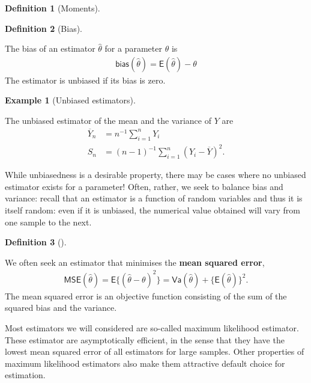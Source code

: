 \documentclass[
  11pt,
  letterpaper,
]{scrbook}
\theoremstyle{plain}
\theoremstyle{definition}
\newtheorem{example}{Example}[chapter]
\theoremstyle{definition}
\newtheorem{definition}{Definition}[chapter]
\theoremstyle{remark}
\begin{document}
\begin{definition}[Moments]
\end{definition}

\begin{definition}[Bias]\protect\hypertarget{def-bias}{}\label{def-bias}

The bias of an estimator \(\hat{\theta}\) for a parameter \(\theta\) is
\begin{align*}
 \mathsf{bias}(\hat{\theta})=\mathsf{E}(\hat{\theta})- \theta
 \end{align*} The estimator is unbiased if its bias is zero.

\end{definition}

\begin{example}[Unbiased
estimators]\protect\hypertarget{exm-unbiased-estimator}{}\label{exm-unbiased-estimator}

The unbiased estimator of the mean and the variance of \(Y\) are
\begin{align*}
\overline{Y}_n &= n^{-1} \sum_{i=1}^n Y_i\\
S_n &= (n-1)^{-1} \sum_{i=1}^n (Y_i-\overline{Y})^2.
\end{align*}

\end{example}

While unbiasedness is a desirable property, there may be cases where no
unbiased estimator exists for a parameter! Often, rather, we seek to
balance bias and variance: recall that an estimator is a function of
random variables and thus it is itself random: even if it is unbiased,
the numerical value obtained will vary from one sample to the next.

\begin{definition}[]\protect\hypertarget{def-mse}{}\label{def-mse}

We often seek an estimator that minimises the \textbf{mean squared
error}, \begin{align*}
\mathsf{MSE}(\hat{\theta}) = \mathsf{E}\{(\hat{\theta}-\theta)^2\}=\mathsf{Va}(\hat{\theta}) + \{\mathsf{E}(\hat{\theta})\}^2.
\end{align*} The mean squared error is an objective function consisting
of the sum of the squared bias and the variance.

\end{definition}

Most estimators we will considered are so-called maximum likelihood
estimator. These estimator are asymptotically efficient, in the sense
that they have the lowest mean squared error of all estimators for large
samples. Other properties of maximum likelihood estimators also make
them attractive default choice for estimation.
\end{document}
